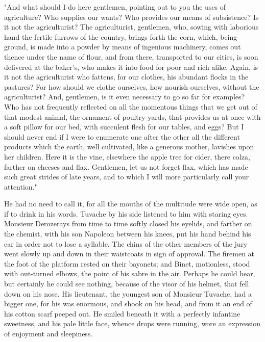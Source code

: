 \documentclass{tufte-book}
\begin{document}
"And what should I do here gentlemen, pointing out to you the uses
of agriculture? Who supplies our wants? Who provides our means of
subsistence? Is it not the agriculturist? The agriculturist, gentlemen,
who, sowing with laborious hand the fertile furrows of the country,
brings forth the corn, which, being ground, is made into a powder by
means of ingenious machinery, comes out thence under the name of flour,
and from there, transported to our cities, is soon delivered at the
baker's, who makes it into food for poor and rich alike. Again, is it
not the agriculturist who fattens, for our clothes, his abundant
flocks in the pastures? For how should we clothe ourselves, how nourish
ourselves, without the agriculturist? And, gentlemen, is it even
necessary to go so far for examples? Who has not frequently reflected
on all the momentous things that we get out of that modest animal, the
ornament of poultry-yards, that provides us at once with a soft pillow
for our bed, with succulent flesh for our tables, and eggs? But I should
never end if I were to enumerate one after the other all the different
products which the earth, well cultivated, like a generous mother,
lavishes upon her children. Here it is the vine, elsewhere the apple
tree for cider, there colza, farther on cheeses and flax. Gentlemen, let
us not forget flax, which has made such great strides of late years, and
to which I will more particularly call your attention."

He had no need to call it, for all the mouths of the multitude were wide
open, as if to drink in his words. Tuvache by his side listened to him
with staring eyes. Monsieur Derozerays from time to time softly closed
his eyelids, and farther on the chemist, with his son Napoleon between
his knees, put his hand behind his ear in order not to lose a syllable.
The chins of the other members of the jury went slowly up and down in
their waistcoats in sign of approval. The firemen at the foot of the
platform rested on their bayonets; and Binet, motionless, stood with
out-turned elbows, the point of his sabre in the air. Perhaps he could
hear, but certainly he could see nothing, because of the visor of his
helmet, that fell down on his nose. His lieutenant, the youngest son of
Monsieur Tuvache, had a bigger one, for his was enormous, and shook on
his head, and from it an end of his cotton scarf peeped out. He smiled
beneath it with a perfectly infantine sweetness, and his pale little
face, whence drops were running, wore an expression of enjoyment and
sleepiness.
\end{document}
